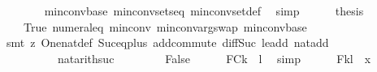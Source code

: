 \begin{isabellebody}
\ \ \ \ \ \ \isamarkupfalse%
\ min{\isacharunderscore}{\kern0pt}conv{\isacharunderscore}{\kern0pt}base\ min{\isacharunderscore}{\kern0pt}conv{\isacharunderscore}{\kern0pt}sets{\isacharunderscore}{\kern0pt}eq\ min{\isacharunderscore}{\kern0pt}conv{\isacharunderscore}{\kern0pt}set{\isacharunderscore}{\kern0pt}def\ \isamarkupfalse%
\ simp\isanewline
\ \ \ \ \isamarkupfalse%
\ {\isacharquery}{\kern0pt}thesis\ \isamarkupfalse%
\ {}\ {}\ {}\ True\ numeral{\isacharunderscore}{\kern0pt}{}{\isacharunderscore}{\kern0pt}eq{\isacharunderscore}{\kern0pt}{}\ min{\isacharunderscore}{\kern0pt}conv{\isacharunderscore}{\kern0pt}{}{\isacharparenleft}{\kern0pt}{}{\isacharparenright}{\kern0pt}\ min{\isacharunderscore}{\kern0pt}conv{\isacharunderscore}{\kern0pt}arg{\isacharunderscore}{\kern0pt}swap\ min{\isacharunderscore}{\kern0pt}conv{\isacharunderscore}{\kern0pt}base\isanewline
\ \ \ \ \ \ \isamarkupfalse%
\ {\isacharparenleft}{\kern0pt}smt\ {\isacharparenleft}{\kern0pt}z{}{\isacharparenright}{\kern0pt}\ One{\isacharunderscore}{\kern0pt}nat{\isacharunderscore}{\kern0pt}def\ Suc{\isacharunderscore}{\kern0pt}eq{\isacharunderscore}{\kern0pt}plus{}\ add{\isachardot}{\kern0pt}commute\ diff{\isacharunderscore}{\kern0pt}Suc{\isacharunderscore}{\kern0pt}{}\ le{\isacharunderscore}{\kern0pt}add{}\ nat{\isacharunderscore}{\kern0pt}{}{\isacharunderscore}{\kern0pt}add{\isacharunderscore}{\kern0pt}{}\isanewline
\ \ \ \ \ \ \ \ \ \ nat{\isacharunderscore}{\kern0pt}arith{\isachardot}{\kern0pt}suc{}{\isacharparenright}{\kern0pt}\isanewline
\ \ \isamarkupfalse%
\isanewline
\ \ \ \ \isamarkupfalse%
\ False\isanewline
\ \ \ \ \isamarkupfalse%
\ FC{}{\isacharcolon}{\kern0pt}{\isachardoublequoteopen}k{\isasymge}{}{\isachardoublequoteclose}\ \ {\isachardoublequoteopen}l{\isasymge}{}{\isachardoublequoteclose}\ \isamarkupfalse%
\ simp{\isacharplus}{\kern0pt}\isanewline
\ \ \ \ \isamarkupfalse%
\ F{}{\isacharcolon}{\kern0pt}{\isachardoublequoteopen}{\isacharparenleft}{\kern0pt}k{\isacharparenright}{\kern0pt}{\isacharplus}{\kern0pt}{\isacharparenleft}{\kern0pt}l{\isacharminus}{\kern0pt}{}{\isacharparenright}{\kern0pt}\ {\isacharequal}{\kern0pt}\ x{\isachardoublequoteclose}\ \isamarkupfalse%

\end{isabellebody}
